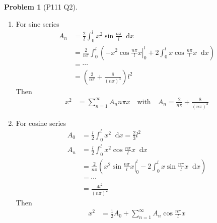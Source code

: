 \documentclass[twoside,11pt]{article}
\renewcommand*\d{\mathop{}\!\mathrm{d}}
\theoremstyle{definition}
\newtheorem{problem}{Problem}
\theoremstyle{remark}
\begin{document}
\begin{problem}[P111 Q2]\
\begin{enumerate}[label=(\alph*)]
\item For sine series
\begin{align*}
    A_n &= \frac{2}{l}\int_0^l x^2\sin\frac{n\pi}{l}\d x\\
    &=\frac{2}{n\pi}\int_0^l \left(
        \left.-x^2\cos\frac{n\pi}{l}x\right |_0^l 
        + 2\int_0^l x\cos\frac{n\pi}{l}x\d x
    \right)\\
    &= \cdots\\
    &= \left(\frac{2}{n\pi} + \frac{8}{(n\pi)^3}\right)l^2
\end{align*}
Then 
\begin{align*}
    x^2 &= \sum_{n=1}^\infty A_n n\pi x\quad\text{with}\quad
    A_n = \frac{2}{n\pi} + \frac{8}{(n\pi)^3}
\end{align*}

\item For cosine series
\begin{align*}
    A_0 &= \frac{l}{2}\int_0^l x^2\d x = \frac{2}{3}l^2\\
    A_n &= \frac{l}{2}\int_0^l x^2\cos\frac{n\pi}{l}x\d x\\
    &= \frac{2}{n\pi}\left(
        \left.x^2\sin\frac{n\pi}{l}x\right |_0^l
        -2\int_0^lx\sin\frac{n\pi}{l}x\d x
    \right)\\
    &=\cdots\\
    &= \frac{4l^2}{(n\pi)^2}
\end{align*}
Then 
\begin{align*}
    x^2 &= \frac{1}{2}A_0 + \sum_{n=1}^\infty A_n\cos\frac{n\pi}{l}x
\end{align*}
\end{enumerate}
\end{problem}
\end{document}
